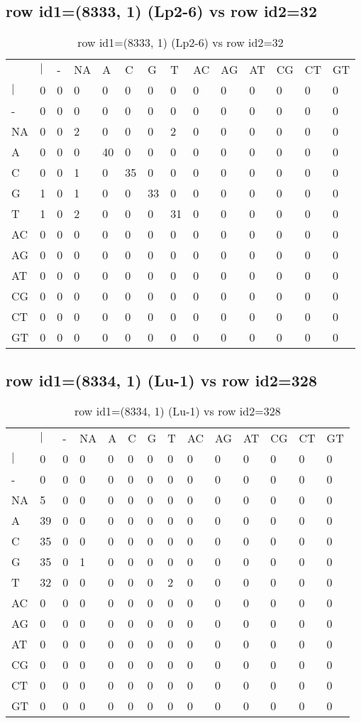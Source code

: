 \subsection{row id1=(8333, 1) (Lp2-6) vs row id2=32}
\begin{center}
\begin{longtable}{|l|l|l|l|l|l|l|l|l|l|l|l|l|l|}
\caption{row id1=(8333, 1) (Lp2-6) vs row id2=32} \label{table_dm528}\\
\hline
\\
\hline
&$|$&-&NA&A&C&G&T&AC&AG&AT&CG&CT&GT\\
$|$&0&0&0&0&0&0&0&0&0&0&0&0&0\\
-&0&0&0&0&0&0&0&0&0&0&0&0&0\\
NA&0&0&2&0&0&0&2&0&0&0&0&0&0\\
A&0&0&0&40&0&0&0&0&0&0&0&0&0\\
C&0&0&1&0&35&0&0&0&0&0&0&0&0\\
G&1&0&1&0&0&33&0&0&0&0&0&0&0\\
T&1&0&2&0&0&0&31&0&0&0&0&0&0\\
AC&0&0&0&0&0&0&0&0&0&0&0&0&0\\
AG&0&0&0&0&0&0&0&0&0&0&0&0&0\\
AT&0&0&0&0&0&0&0&0&0&0&0&0&0\\
CG&0&0&0&0&0&0&0&0&0&0&0&0&0\\
CT&0&0&0&0&0&0&0&0&0&0&0&0&0\\
GT&0&0&0&0&0&0&0&0&0&0&0&0&0\\
\hline
\end{longtable}
\end{center}

\subsection{row id1=(8334, 1) (Lu-1) vs row id2=328}
\begin{center}
\begin{longtable}{|l|l|l|l|l|l|l|l|l|l|l|l|l|l|}
\caption{row id1=(8334, 1) (Lu-1) vs row id2=328} \label{table_dm530}\\
\hline
\\
\hline
&$|$&-&NA&A&C&G&T&AC&AG&AT&CG&CT&GT\\
$|$&0&0&0&0&0&0&0&0&0&0&0&0&0\\
-&0&0&0&0&0&0&0&0&0&0&0&0&0\\
NA&5&0&0&0&0&0&0&0&0&0&0&0&0\\
A&39&0&0&0&0&0&0&0&0&0&0&0&0\\
C&35&0&0&0&0&0&0&0&0&0&0&0&0\\
G&35&0&1&0&0&0&0&0&0&0&0&0&0\\
T&32&0&0&0&0&0&2&0&0&0&0&0&0\\
AC&0&0&0&0&0&0&0&0&0&0&0&0&0\\
AG&0&0&0&0&0&0&0&0&0&0&0&0&0\\
AT&0&0&0&0&0&0&0&0&0&0&0&0&0\\
CG&0&0&0&0&0&0&0&0&0&0&0&0&0\\
CT&0&0&0&0&0&0&0&0&0&0&0&0&0\\
GT&0&0&0&0&0&0&0&0&0&0&0&0&0\\
\hline
\end{longtable}
\end{center}

